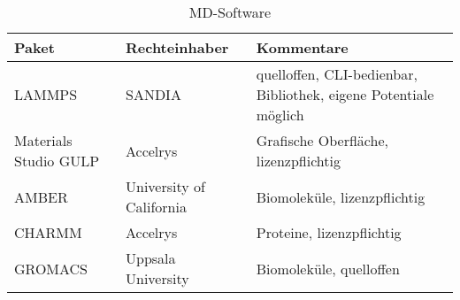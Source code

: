 \begin{table}
  \oddrowcolors
  \caption[MD-Software]{MD-Software}
  \label{tab:mdsoftware}
  \begin{tabularx}{\textwidth}{|llX|}
    \hline
    \textbf{Paket}        & \textbf{Rechteinhaber}   & \textbf{Kommentare}                                              \\
    \hline
    LAMMPS                & SANDIA                   & quelloffen, CLI-bedienbar, Bibliothek, eigene Potentiale möglich \\
    Materials Studio GULP & Accelrys                 & Grafische Oberfläche, lizenzpflichtig                            \\
    AMBER                 & University of California & Biomoleküle, lizenzpflichtig                                     \\
    CHARMM                & Accelrys                 & Proteine, lizenzpflichtig                                        \\
    GROMACS               & Uppsala University       & Biomoleküle, quelloffen                                          \\
    \hline
  \end{tabularx}
\end{table}
